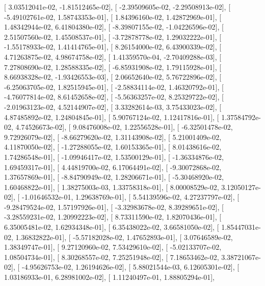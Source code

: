 \documentclass{article}
\begin{document}
       [  3.03512041e-02,  -1.81512465e-02],
       [ -2.39509605e-02,  -2.29508913e-02],
       [ -5.49102761e-02,   1.58743353e-01],
       [  1.84396160e-02,   1.42872969e-01],
       [  1.48342944e-02,   6.41804380e-02],
       [ -8.39807155e-02,  -1.04226596e-02],
       [  2.51507560e-02,   1.45508537e-01],
       [ -3.72878778e-02,   1.29032222e-01],
       [ -1.55178933e-02,   1.41414765e-01],
       [  8.26154000e-02,   6.43900339e-02],
       [  4.71263875e-02,   4.98674758e-02],
       [  1.41359570e-04,  -2.70409288e-03],
       [  7.27808690e-02,   1.28588335e-02],
       [ -6.85931908e-02,   1.79115928e-01],
       [  8.66938328e-02,  -1.93426553e-03],
       [  2.06652640e-02,   5.76722896e-02],
       [ -6.25063705e-02,   1.82515945e-01],
       [ -2.58834114e-02,   1.46320792e-01],
       [ -4.76077814e-02,   8.61452658e-02],
       [ -5.56363257e-02,   8.25329722e-02],
       [ -2.01963123e-02,   4.52144907e-02],
       [  3.33282614e-03,   3.75433023e-02],
       [  4.87485892e-02,   1.24804845e-01],
       [  5.90767124e-02,   1.12417816e-01],
       [  1.37584792e-02,   4.74526673e-02],
       [  9.08476008e-02,   1.22556528e-01],
       [ -6.32501478e-02,   9.72926079e-02],
       [ -8.66279620e-02,   1.31143908e-02],
       [  5.21001409e-02,   4.11870050e-02],
       [ -1.27288055e-02,   1.60153365e-01],
       [  8.01438616e-02,   1.74286548e-01],
       [ -1.09946417e-02,   1.53500129e-01],
       [ -1.36334876e-02,   1.69459317e-01],
       [  4.44819700e-02,   6.17064491e-02],
       [ -9.30072868e-02,   1.37657869e-01],
       [ -8.84790949e-02,   1.28206671e-01],
       [ -5.30468920e-02,   1.60468822e-01],
       [  1.38275003e-03,   1.33758318e-01],
       [  8.00008529e-02,   3.12050127e-02],
       [ -1.01646532e-01,   1.29638769e-01],
       [  5.54139596e-02,   4.27237797e-02],
       [ -9.28479524e-02,   1.57197926e-01],
       [ -3.32983678e-02,   8.39289651e-02],
       [ -3.28559231e-02,   1.20992223e-02],
       [  8.73311590e-02,   1.82070436e-01],
       [  6.35005481e-02,   1.62934348e-01],
       [  6.35438022e-02,   3.66581050e-02],
       [  1.85447031e-02,   1.36832822e-01],
       [ -5.57182028e-02,   1.47652893e-01],
       [  3.07646589e-02,   1.38349747e-01],
       [  9.27120960e-02,   7.53429610e-02],
       [ -5.02133707e-02,   1.08504734e-01],
       [  8.30268557e-02,   7.25251948e-02],
       [  7.18653462e-02,   3.38721067e-02],
       [ -4.95626753e-02,   1.26194626e-02],
       [  5.88021544e-03,   6.12605301e-02],
       [  1.03186933e-01,   6.28981002e-02],
       [  1.11240497e-01,   1.88805294e-01],
\end{document}
